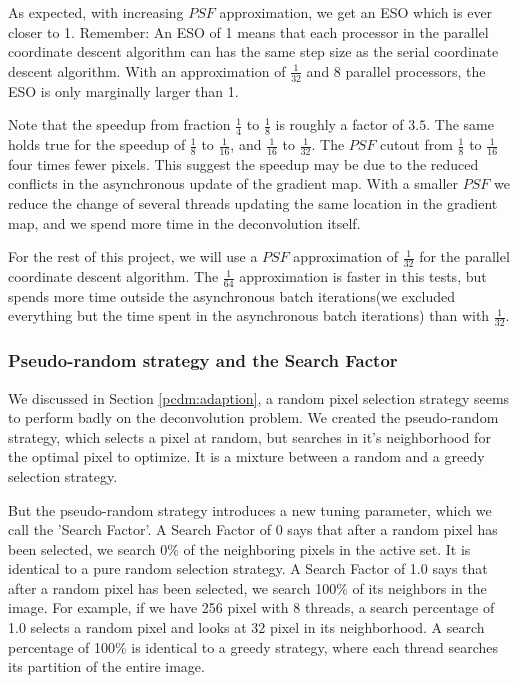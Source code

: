 As expected, with increasing $PSF$ approximation, we get an ESO which is ever closer to 1. Remember: An ESO of 1 means that each processor in the parallel coordinate descent algorithm can has the same step size as the serial coordinate descent algorithm. With an approximation of $\frac{1}{32}$ and 8 parallel processors, the ESO is only marginally larger than 1.

Note that the speedup from fraction $\frac{1}{4}$ to $\frac{1}{8}$ is roughly a factor of $3.5$. The same holds true for the speedup of $\frac{1}{8}$ to $\frac{1}{16}$, and $\frac{1}{16}$ to $\frac{1}{32}$. The $PSF$ cutout from  $\frac{1}{8}$ to  $\frac{1}{16}$ four times fewer pixels. This suggest the speedup may be due to the reduced conflicts in the asynchronous update of the gradient map. With a smaller $PSF$ we reduce the change of several threads updating the same location in the gradient map, and we spend more time in the deconvolution itself.

For the rest of this project, we will use a $PSF$ approximation of $\frac{1}{32}$ for the parallel coordinate descent algorithm. The $\frac{1}{64}$ approximation is faster in this tests, but spends more time outside the asynchronous batch iterations(we excluded everything but the time spent in the asynchronous batch iterations) than with $\frac{1}{32}$.


\subsubsection{Pseudo-random strategy and the Search Factor}\label{pcdm:results:fraction}
We discussed in Section \ref{pcdm:adaption}, a random pixel selection strategy seems to perform badly on the deconvolution problem. We created the pseudo-random strategy, which selects a pixel at random, but searches in it's neighborhood for the optimal pixel to optimize. It is a mixture between a random and a greedy selection strategy.

But the pseudo-random strategy introduces a new tuning parameter, which we call the 'Search Factor'. A Search Factor of 0 says that after a random pixel has been selected, we search 0\% of the neighboring pixels in the active set. It is identical to a pure random selection strategy. A Search Factor of 1.0 says that after a random pixel has been selected, we search 100\% of its neighbors in the image. For example, if we have 256 pixel with 8 threads, a search percentage of 1.0 selects a random pixel and looks at 32 pixel in its neighborhood. A search percentage of 100\% is identical to a greedy strategy, where each thread searches its partition of the entire image.

